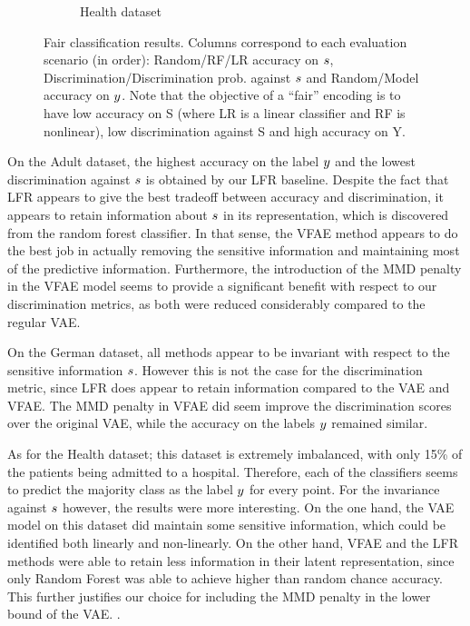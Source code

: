 \begin{figure}[ht]
\begin{subfigure}{\linewidth}
\begin{subfigure}{.329\textwidth}
  \end{subfigure}
  \caption{Health dataset}
  \end{subfigure}%
  \caption{Fair classification results. Columns correspond to each evaluation scenario (in order): Random/RF/LR accuracy on $\*s$, Discrimination/Discrimination prob. against $\*s$ and Random/Model accuracy on $\*y$. Note that the objective of a ``fair'' encoding is to have low accuracy on S (where LR is a linear classifier and RF is nonlinear), low discrimination against S and high accuracy on Y.}
  \label{tab:fair_results}
\end{figure}

On the Adult dataset, the highest accuracy on the label $\*y$ and the lowest discrimination against $\*s$ is obtained by our LFR baseline. Despite the fact that LFR appears to give the best tradeoff between accuracy and discrimination, it appears to retain information about $\*s$ in its representation, which is discovered from the random forest classifier. In that sense, the VFAE method appears to do the best job in actually removing the sensitive information and maintaining most of the predictive information. Furthermore, the introduction of the MMD penalty in the VFAE model seems to provide a significant benefit with respect to our discrimination metrics, as both were reduced considerably compared to the regular VAE. 

On the German dataset, all methods appear to be invariant with respect to the sensitive information $\*s$. However this is not the case for the discrimination metric, since LFR does appear to retain information compared to the VAE and VFAE. The MMD penalty in VFAE did seem improve the discrimination scores over the original VAE, while the accuracy on the labels $\*y$ remained similar. 

As for the Health dataset; this dataset is extremely imbalanced, with only 15\% of the patients being admitted to a hospital. Therefore, each of the classifiers seems to predict the majority class as the label $\*y$ for every point. For the invariance against $\*s$ however, the results were more interesting. On the one hand, the VAE model on this dataset did maintain some sensitive information, which could be identified both linearly and non-linearly. On the other hand, VFAE and the LFR methods were able to retain less information in their latent representation, since only Random Forest was able to achieve higher than random chance accuracy. This further justifies our choice for including the MMD penalty in the lower bound of the VAE. .

